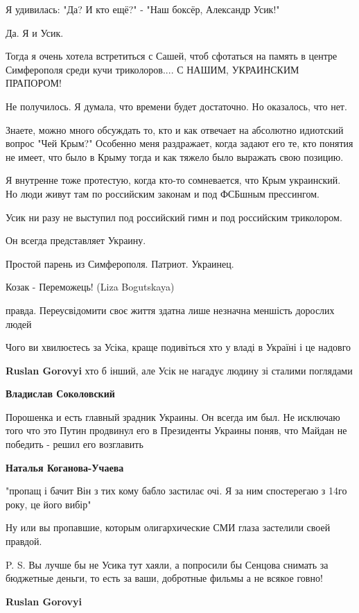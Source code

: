 \begin{itemize}
\begin{itemize}
Я удивилась: "Да? И кто ещё?" - "Наш боксёр, Александр Усик!"

Да. Я и Усик.

Тогда я очень хотела встретиться с Сашей, чтоб сфотаться на память в центре
Симферополя среди кучи триколоров.... С НАШИМ, УКРАИНСКИМ ПРАПОРОМ!

Не получилось. Я думала, что времени будет достаточно. Но оказалось, что нет.

Знаете, можно много обсуждать то, кто и как отвечает на абсолютно идиотский
вопрос "Чей Крым?" Особенно меня раздражает, когда задают его те, кто понятия
не имеет, что было в Крыму тогда и как тяжело было выражать свою позицию.

Я внутренне тоже протестую, когда кто-то сомневается, что Крым украинский. Но
люди живут там по российским законам и под ФСБшным прессингом.

Усик ни разу не выступил под российский гимн и под российским триколором.

Он всегда представляет Украину.

Простой парень из Симферополя. Патриот. Украинец.

Козак - Переможець! (Liza Bogutskaya)

правда. Переусвідомити своє життя здатна лише незначна меншість дорослих людей

Чого ви хвилюєтесь за Усіка, краще подивіться хто у владі в Україні і це надовго

\textbf{Ruslan Gorovyi} хто б інший, але Усік не нагадує людину зі сталими поглядами

\textbf{Владислав Соколовский} 

Порошенка и есть главный зрадник Украины. Он всегда им был. Не исключаю того
что это Путин продвинул его в Президенты Украины поняв, что Майдан не победить
- решил его возглавить

\textbf{Наталья Коганова-Учаева} 

"пропащ і бачит Він з тих кому бабло застилає очі. Я за ним спостерегаю з 14го
року, це його вибір"

Ну или вы пропавшие, которым олигархические СМИ глаза застелили своей правдой.

P. S. Вы лучше бы не Усика тут хаяли, а попросили бы Сенцова снимать за
бюджетные деньги, то есть за ваши, добротные фильмы а не всякое говно!


\textbf{Ruslan Gorovyi} 


\end{itemize}
\end{itemize}
